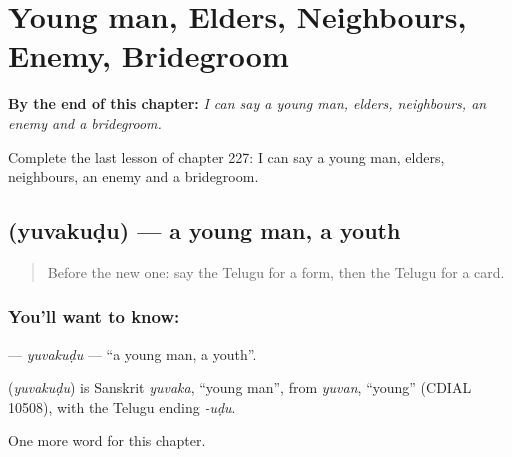 
\chapter{Young man, Elders, Neighbours, Enemy, Bridegroom}
\label{ch:te-young-man-elders-neighbours-enemy-bridegroom}

\begin{chapteropening}
\textbf{By the end of this chapter:} \emph{I can say a young man, elders, neighbours, an enemy and a bridegroom.}

Complete the last lesson of chapter 227: I can say a young man, elders, neighbours, an enemy and a bridegroom.
\end{chapteropening}

\section[\texorpdfstring{\te{యువకుడు} (yuvakuḍu)}{యువకుడు (yuvakuḍu)}]{ (yuvakuḍu) — a young man, a youth}

\label{lesson:TE-C227-yuvakudu}



\begin{quote}
Before the new one: say the Telugu for a form, then the Telugu for a card.
\end{quote}

\subsection*{You'll want to know: }
\textbf{} — \emph{yuvakuḍu} — \textquotedblleft{}a young man, a youth\textquotedblright{}.

\begin{cousinweb}
\textbf{} (\emph{yuvakuḍu}) is Sanskrit \emph{yuvaka}, \textquotedblleft{}young man\textquotedblright{}, from \emph{yuvan}, \textquotedblleft{}young\textquotedblright{} (CDIAL 10508), with the Telugu ending \emph{-uḍu}.
\end{cousinweb}

\begin{grammarlens}[title={What you've built}]
One more word for this chapter.
\end{grammarlens}

